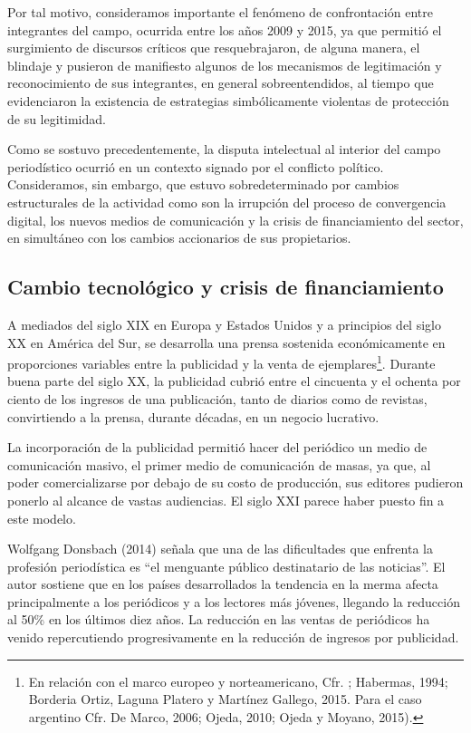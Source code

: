 Por tal motivo, consideramos importante el fenómeno de confrontación entre integrantes del campo, ocurrida entre los años 2009 y 2015, ya que permitió el surgimiento de discursos críticos que resquebrajaron, de alguna manera, el blindaje y pusieron de manifiesto algunos de los mecanismos de legitimación y reconocimiento de sus integrantes, en general sobreentendidos, al tiempo que evidenciaron la existencia de estrategias simbólicamente violentas de protección de su legitimidad.

Como se sostuvo precedentemente, la disputa intelectual al interior del campo periodístico ocurrió en un contexto signado por el conflicto político. Consideramos, sin embargo, que estuvo sobredeterminado por cambios estructurales de la actividad como son la irrupción del proceso de convergencia digital, los nuevos medios de comunicación y la crisis de financiamiento del sector, en simultáneo con los cambios accionarios de sus propietarios.

\subsection {Cambio tecnológico y crisis de financiamiento}
A mediados del siglo XIX en Europa y Estados Unidos y a principios del siglo XX en América del Sur, se desarrolla una prensa sostenida económicamente en proporciones variables entre la publicidad y la venta de ejemplares\footnote{En relación con el marco europeo y norteamericano, Cfr. \cite{@6968-BARBIER1999}; Habermas, 1994; Borderia Ortiz, Laguna Platero y Martínez Gallego, 2015. Para el caso argentino Cfr. De Marco, 2006; Ojeda, 2010; Ojeda y Moyano, 2015).}. Durante buena parte del siglo XX, la publicidad cubrió entre el cincuenta y el ochenta por ciento de los ingresos de una publicación, tanto de diarios como de revistas, convirtiendo a la prensa, durante décadas, en un negocio lucrativo.

La incorporación de la publicidad permitió hacer del periódico un medio de comunicación masivo, el primer medio de comunicación de masas, ya que, al poder comercializarse por debajo de su costo de producción, sus editores pudieron ponerlo al alcance de vastas audiencias. El siglo XXI parece haber puesto fin a este modelo.

Wolfgang Donsbach (2014) señala que una de las dificultades que enfrenta la profesión periodística es ``el menguante público destinatario de las noticias''. El autor sostiene que en los países desarrollados la tendencia en la merma afecta principalmente a los periódicos y a los lectores más jóvenes, llegando la reducción al 50\% en los últimos diez años. La reducción en las ventas de periódicos ha venido repercutiendo progresivamente en la reducción de ingresos por publicidad.

